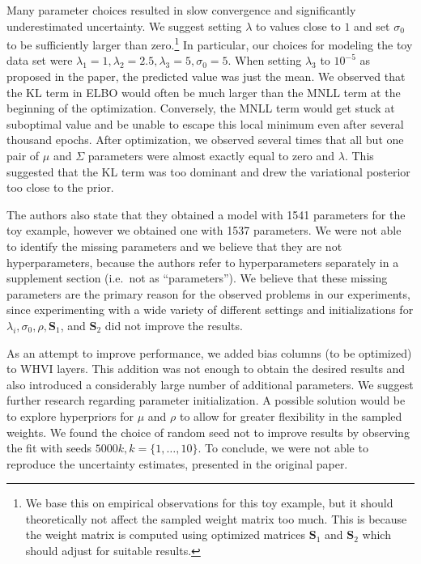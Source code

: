 Many parameter choices resulted in slow convergence and significantly underestimated uncertainty.
We suggest setting $\lambda$ to values close to $1$ and set $\sigma_0$ to be sufficiently larger than zero.\footnote{We base this on empirical observations for this toy example, but it should theoretically not affect the sampled weight matrix too much. This is because the weight matrix is computed using optimized matrices $\mathbf{S}_1$ and $\mathbf{S}_2$ which should adjust for suitable results.}
In particular, our choices for modeling the toy data set were $\lambda_1=1, \lambda_2=2.5,\lambda_3=5, \sigma_0=5$.
When setting $\lambda_3$ to $10^{-5}$ as proposed in the paper, the predicted value was just the mean.
We observed that the KL term in ELBO would often be much larger than the MNLL term at the beginning of the optimization.
Conversely, the MNLL term would get stuck at suboptimal value and be unable to escape this local minimum even after several thousand epochs.
After optimization, we observed several times that all but one pair of $\mu$ and $\Sigma$ parameters were almost exactly equal to zero and $\lambda$.
This suggested that the KL term was too dominant and drew the variational posterior too close to the prior.

The authors also state that they obtained a model with 1541 parameters for the toy example, however we obtained one with 1537 parameters.
We were not able to identify the missing parameters and we believe that they are not hyperparameters, because the authors refer to hyperparameters separately in a supplement section (i.e.\ not as ``parameters'').
We believe that these missing parameters are the primary reason for the observed problems in our experiments, since experimenting with a wide variety of different settings and initializations for $\lambda_i, \sigma_0, \rho, \mathbf{S}_1$, and $\mathbf{S}_2$ did not improve the results.

As an attempt to improve performance, we added bias columns (to be optimized) to WHVI layers.
This addition was not enough to obtain the desired results and also introduced a considerably large number of additional parameters.
We suggest further research regarding parameter initialization.
A possible solution would be to explore hyperpriors for $\mu$ and $\rho$ to allow for greater flexibility in the sampled weights.
We found the choice of random seed not to improve results by observing the fit with seeds $5000k, k = \{1, \dots, 10\}$.
To conclude, we were not able to reproduce the uncertainty estimates, presented in the original paper.

